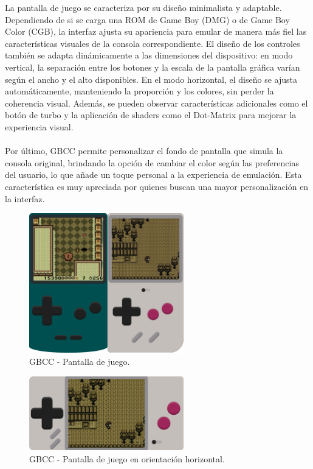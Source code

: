 La pantalla de juego se caracteriza por su diseño minimalista y adaptable. Dependiendo de si se carga una ROM de Game Boy (DMG) o de Game Boy Color (CGB), la interfaz ajusta su apariencia para emular de manera más fiel las características visuales de la consola correspondiente. El diseño de los controles también se adapta dinámicamente a las dimensiones del dispositivo: en modo vertical, la separación entre los botones y la escala de la pantalla gráfica varían según el ancho y el alto disponibles. En el modo horizontal, el diseño se ajusta automáticamente, manteniendo la proporción y los colores, sin perder la coherencia visual. Además, se pueden observar características adicionales como el botón de turbo y la aplicación de shaders como el Dot-Matrix para mejorar la experiencia visual.
\\\\
Por último, GBCC permite personalizar el fondo de pantalla que simula la consola original, brindando la opción de cambiar el color según las preferencias del usuario, lo que añade un toque personal a la experiencia de emulación. Esta característica es muy apreciada por quienes buscan una mayor personalización en la interfaz.

\begin{figure}[h]
    \centering
    \includegraphics[width=0.6\textwidth]{include/images/gbccgame.png}
    \caption{GBCC - Pantalla de juego.}
    \label{figure:gbccgame}
\end{figure}

\begin{figure}[h]
    \centering
    \includegraphics[width=0.6\textwidth]{include/images/gbccgameportrait.png}
    \caption{GBCC - Pantalla de juego en orientación horizontal.}
    \label{figure:gbccgameportrait}
\end{figure}


